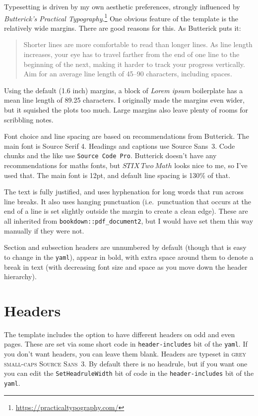 \documentclass[
  a4paper,
  twoside]{article}
\newcommand{\headerdemo}[1]{{\sffamily\scshape\color{black!60}\fontsize{11}{12}\selectfont #1}}
\begin{document}
Typesetting is driven by my own aesthetic preferences, strongly influenced by \emph{Butterick's Practical Typography}.\footnote{\url{https://practicaltypography.com/}} One obvious feature of the template is the relatively wide margins. There are good reasons for this. As Butterick puts it:

\begin{quote}
Shorter lines are more comfortable to read than longer lines. As line length increases, your eye has to travel farther from the end of one line to the beginning of the next, making it harder to track your progress vertically. Aim for an average line length of 45--90 characters, including spaces.
\end{quote}

Using the default (1.6 inch) margins, a block of \emph{Lorem ipsum} boilerplate has a mean line length of 89.25 characters. I originally made the margins even wider, but it squished the plots too much. Large margins also leave plenty of rooms for scribbling notes.

Font choice and line spacing are based on recommendations from Butterick. The main font is Source Serif 4. Headings and captions use \textsf{Source Sans~3}. Code chunks and the like use \texttt{Source\ Code\ Pro}. Butterick doesn't have any recommendations for maths fonts, but \(STIX \ Two \ Math\) looks nice to me, so I've used that. The main font is 12pt, and default line spacing is 130\% of that.

The text is fully justified, and uses hyphenation for long words that run across line breaks. It also uses hanging punctuation (i.e.~punctuation that occurs at the end of a line is set slightly outside the margin to create a clean edge). These are all inherited from \texttt{bookdown::pdf\_document2}, but I would have set them this way manually if they were not.

Section and subsection headers are unnumbered by default (though that is easy to change in the \texttt{yaml}), appear in bold, with extra space around them to denote a break in text (with decreasing font size and space as you move down the header hierarchy).

\section{Headers}\label{headers}

The template includes the option to have different headers on odd and even pages. These are set via some short code in \texttt{header-includes} bit of the \texttt{yaml}. If you don't want headers, you can leave them blank. Headers are typeset in \headerdemo{grey small-caps Source Sans~3}. By default there is no headrule, but if you want one you can edit the \texttt{SetHeadruleWidth} bit of code in the \texttt{header-includes} bit of the \texttt{yaml}.
\end{document}
